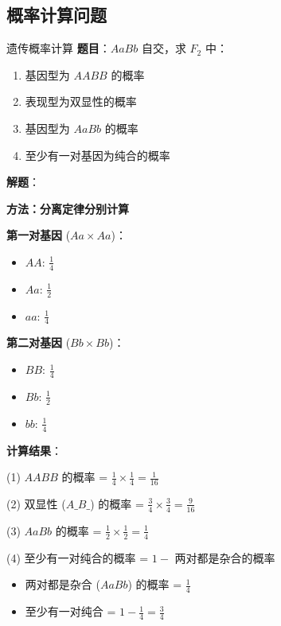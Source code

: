 \documentclass[a4paper,11pt]{ctexart}
\begin{document}
\subsection{概率计算问题}

\begin{examplebox}{遗传概率计算}
\textbf{题目}：$AaBb$ 自交，求 $F_2$ 中：
\begin{enumerate}[leftmargin=2em]
    \item 基因型为 $AABB$ 的概率
    \item 表现型为双显性的概率
    \item 基因型为 $AaBb$ 的概率
    \item 至少有一对基因为纯合的概率
\end{enumerate}

\textbf{解题}：

\textbf{方法：分离定律分别计算}

\textbf{第一对基因} ($Aa \times Aa$)：
\begin{itemize}[leftmargin=2em]
    \item $AA$: $\frac{1}{4}$
    \item $Aa$: $\frac{1}{2}$
    \item $aa$: $\frac{1}{4}$
\end{itemize}

\textbf{第二对基因} ($Bb \times Bb$)：
\begin{itemize}[leftmargin=2em]
    \item $BB$: $\frac{1}{4}$
    \item $Bb$: $\frac{1}{2}$
    \item $bb$: $\frac{1}{4}$
\end{itemize}

\textbf{计算结果}：

(1) $AABB$ 的概率 = $\frac{1}{4} \times \frac{1}{4} = \frac{1}{16}$

(2) 双显性 ($A\_B\_$) 的概率 = $\frac{3}{4} \times \frac{3}{4} = \frac{9}{16}$

(3) $AaBb$ 的概率 = $\frac{1}{2} \times \frac{1}{2} = \frac{1}{4}$

(4) 至少有一对纯合的概率 = $1 - $ 两对都是杂合的概率
\begin{itemize}[leftmargin=2em]
    \item 两对都是杂合 ($AaBb$) 的概率 = $\frac{1}{4}$
    \item 至少有一对纯合 = $1 - \frac{1}{4} = \frac{3}{4}$
\end{itemize}
\end{examplebox}
\end{document}
